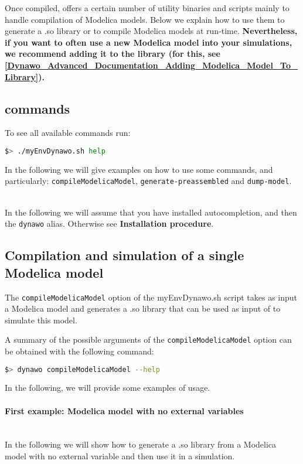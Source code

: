 \documentclass[a4paper, 12pt]{report}
\begin{document}
Once compiled, \Dynawo offers a certain number of utility binaries and scripts
mainly to handle compilation of Modelica models. Below we explain how to use
them to generate a .so library or to compile Modelica models at run-time.
\textbf{Nevertheless, if you want to often use a new Modelica model into your simulations, we recommend adding it to the \Dynawo library (for this, see \ref{Dynawo_Advanced_Documentation_Adding_Modelica_Model_To_Library}).} \\

\subsection[Dynawo commands]{\Dynawo commands}

To see all available \Dynawo commands run:
\begin{lstlisting}[language=bash,deletekeywords={jobs,help}]
$> ./myEnvDynawo.sh help
\end{lstlisting}

In the following we will give examples on how to use some commands, and particularly: \lstinline[language=bash]{compileModelicaModel}, \lstinline[language=bash]{generate-preassembled} and \lstinline[language=bash]{dump-model}.

~~\\
In the following we will assume that you have installed autocompletion, and then the \lstinline[language=bash]{dynawo} alias. Otherwise see \textbf{Installation procedure}.

\subsection{Compilation and simulation of a single Modelica model}

The \lstinline[language=bash]{compileModelicaModel} option of the myEnvDynawo.sh script takes as input a Modelica model and generates a .so library that can be used as input of \Dynawo to simulate this model.

A summary of the possible arguments of the \lstinline[language=bash]{compileModelicaModel} option can be obtained with the following
command:
\begin{lstlisting}[language=bash,deletekeywords={jobs,help}]
$> dynawo compileModelicaModel --help
\end{lstlisting}

In the following, we will provide some examples of usage.

\paragraph{First example: Modelica model with no external variables}
~~\\
In the following we will show how to generate a .so library from a
Modelica model with no external variable and then use it in a \Dynawo
simulation.
\end{document}
